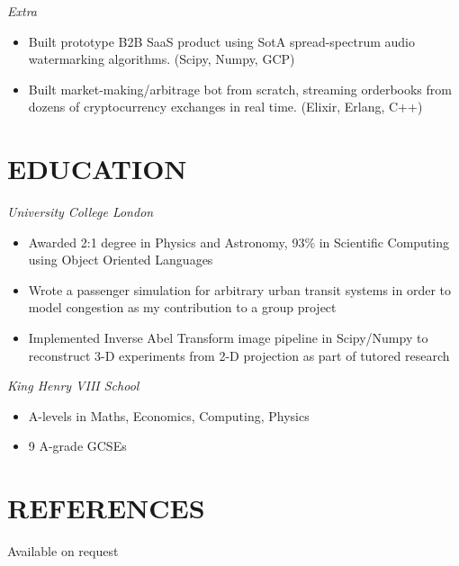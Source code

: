 \documentclass[margin, 10pt]{res}
\begin{document}
\begin{resume}
{\sl Extra}
\begin{itemize}
\item Built prototype B2B SaaS product using SotA spread-spectrum audio watermarking algorithms. (Scipy, Numpy, GCP)
\item Built market-making/arbitrage bot from scratch, streaming orderbooks from dozens of cryptocurrency exchanges in real time. (Elixir, Erlang, C++)
\end{itemize}


\section{EDUCATION}

{\sl University College London} \\
\begin{itemize} \itemsep -1pt
\item Awarded 2:1 degree in Physics and Astronomy, 93\% in Scientific Computing using Object Oriented Languages
\item Wrote a passenger simulation for arbitrary urban transit systems in order to model congestion as my contribution to a group project
\item Implemented Inverse Abel Transform image pipeline in Scipy/Numpy to reconstruct 3-D experiments from 2-D projection as part of tutored research
\end{itemize}

{\sl King Henry VIII School} \\
\begin{itemize}
\item A-levels in Maths, Economics, Computing, Physics
\item 9 A-grade GCSEs
\end{itemize}

\section{REFERENCES}
Available on request

\end{resume}
\end{document}
